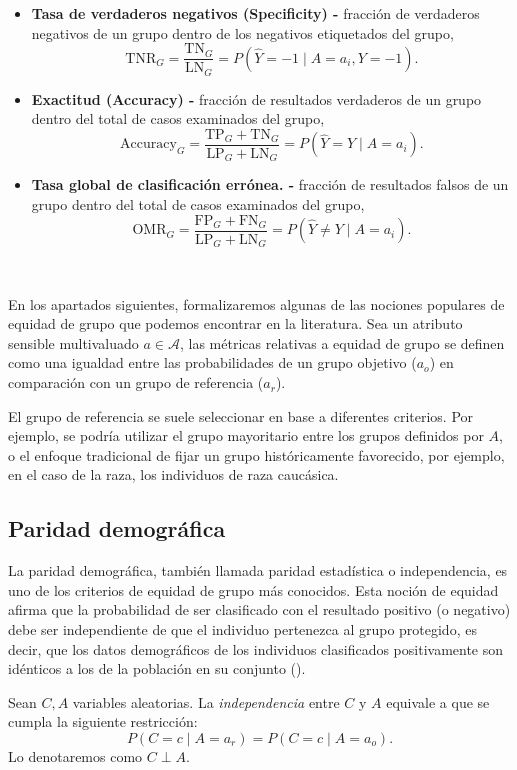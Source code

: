 \documentclass[oneside,openright,titlepage,numbers=noenddot,openany,headinclude,footinclude=true,
cleardoublepage=empty,abstractoff,BCOR=5mm,paper=a4,fontsize=12pt,main=spanish]{scrreprt}
\begin{document}
\begin{itemize}
    \item \textbf{Tasa de verdaderos negativos (Specificity) -} fracción de verdaderos negativos de un grupo dentro de los negativos etiquetados del grupo, $$\text{TNR}_G = \frac{\text{TN}_G}{\text{LN}_G} = P(\hat{Y}=-1 \mid A=a_i,Y=-1).$$
    \item \textbf{Exactitud (Accuracy) -} fracción de resultados verdaderos de un grupo dentro del total de casos examinados del grupo, $$\text{Accuracy}_G = \frac{\text{TP}_G+\text{TN}_G}{\text{LP}_G+\text{LN}_G} = P(\hat{Y}=Y \mid A=a_i).$$
    \item \textbf{Tasa global de clasificación errónea. -} fracción de resultados falsos de un grupo dentro del total de casos examinados del grupo, $$\text{OMR}_G = \frac{\text{FP}_G+\text{FN}_G}{\text{LP}_G+\text{LN}_G} = P(\hat{Y}\neq Y \mid A=a_i).$$
\end{itemize}\

En los apartados siguientes, formalizaremos algunas de las nociones populares de equidad de grupo que podemos encontrar en la literatura. Sea un atributo sensible multivaluado $a\in \mathcal{A}$, las métricas relativas a equidad de grupo se definen como una igualdad entre las probabilidades de un grupo objetivo ($a_o$) en comparación con un grupo de referencia ($a_r$).

El grupo de referencia se suele seleccionar en base a diferentes criterios. Por ejemplo, se podría utilizar el grupo mayoritario entre los grupos definidos por $A$, o el enfoque
tradicional de fijar un grupo históricamente favorecido, por ejemplo, en el caso de la raza, los individuos de raza caucásica.


\subsection{Paridad demográfica}

La paridad demográfica, también llamada paridad estadística o independencia, es uno de los criterios de equidad de grupo más conocidos. Esta noción de equidad afirma que la probabilidad de ser clasificado con el resultado positivo (o negativo) debe ser independiente de que el individuo pertenezca al grupo protegido, es decir, que los datos demográficos de los individuos clasificados positivamente son idénticos a los de la población en su conjunto (\cite{detect2012}).\\

\begin{definition}
Sean $C,A$ variables aleatorias. La \textit{independencia} entre $C$ y $A$ equivale a que se cumpla la siguiente restricción:
$$P(C=c \mid A=a_r)=P(C=c \mid A=a_o).$$
Lo denotaremos como $C \perp A.$
\end{definition}\
\end{document}
